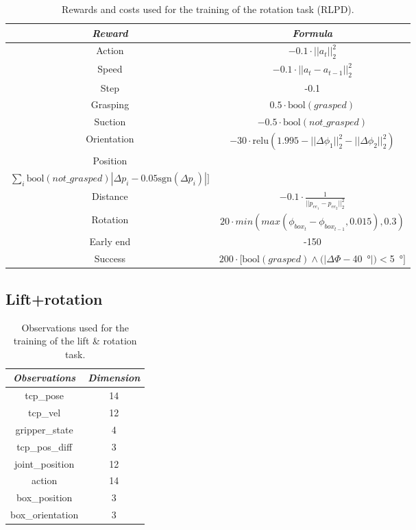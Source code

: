 \documentclass[letterpaper, 10 pt, conference]{ieeeconf}  %
\begin{document}
\begin{table}[H]
    \centering
    \caption{Rewards and costs used for the training of the rotation task (RLPD).}
    \renewcommand{\arraystretch}{1.5}
    \begin{tabular}{c|c}
    \toprule \textbf{\textit{Reward}} & \textbf{\textit{Formula}}\\
    \midrule Action & $-0.1\cdot || a_{t} ||^2_2$\\
    Speed  & $-0.1\cdot || a_t - a_{t-1}||^2_2$\\
    Step & -0.1\\
    Grasping & $0.5\cdot \text{bool}(grasped) $\\
    Suction & $-0.5\cdot \text{bool}(not\_grasped) $\\
    Orientation & $-30\cdot \text{relu}(1.995 - ||\Delta\phi_{1}||^2_2 - ||\Delta\phi_{2}||^2_2)$\\
    Position & \makecell{$-15\cdot [\sum_i\text{bool}(grasped)|\Delta p_{i} - 0.35\text{sgn}(\Delta p_{i})|+$ \\ $\sum_i \text{bool}(not\_grasped)|\Delta p_{i} - 0.05\text{sgn}(\Delta p_{i})|]$}\\
    Distance & $-0.1\cdot \frac{1}{||p_{ee_1} - p_{ee_2}||^2_2}$\\
    Rotation & $20\cdot min(max(\phi_{box_t} - \phi_{box_{t-1}}, 0.015), 0.3)$\\
    Early end & -150 \\
    Success & $200\cdot [\text{bool}(grasped)\land (|\Delta\Phi-$\SI{40}{\degree}$|)<$\SI{5}{\degree}$]$ \\
    \bottomrule
    \end{tabular}
    \label{rot_drq_rew}
\end{table}

\subsection{Lift+rotation}

\begin{table}[H]
    \centering
    \caption{Observations used for the training of the lift \& rotation task.}
    \renewcommand{\arraystretch}{1.5}
    \begin{tabular}{c|c}
    \toprule \textit{\textbf{Observations}} & \textit{\textbf{Dimension}} \\
    \midrule tcp\_pose & 14 \\
    tcp\_vel & 12 \\
    gripper\_state & 4 \\
    tcp\_pos\_diff & 3 \\
    joint\_position & 12 \\
    action & 14 \\
    box\_position & 3 \\
    box\_orientation & 3 \\
    \bottomrule
    \end{tabular}
    \label{inair_obs}
\end{table}
\end{document}
